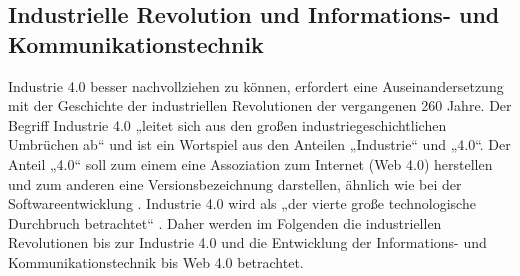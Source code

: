 \subsection{Industrielle Revolution und Informations- und Kommunikationstechnik}\label{sec:GeschichteIndustrie4}
Industrie 4.0 besser nachvollziehen zu können, erfordert eine Auseinandersetzung mit der Geschichte der industriellen Revolutionen der vergangenen 260 Jahre. Der Begriff Industrie 4.0 „leitet sich aus den großen industriegeschichtlichen Umbrüchen ab“ \cite{7} und ist ein Wortspiel aus den Anteilen „Industrie“ und „4.0“. Der Anteil „4.0“ soll zum einem eine Assoziation zum Internet (Web 4.0) herstellen und zum anderen eine Versionsbezeichnung darstellen, ähnlich wie bei der Softwareentwicklung \cite{1}.
\newline
Industrie 4.0 wird als „der vierte große technologische Durchbruch betrachtet“ \cite{7}. Daher werden im Folgenden die industriellen Revolutionen bis zur Industrie 4.0 und die Entwicklung der Informations- und Kommunikationstechnik bis Web 4.0 betrachtet.
\newpage

